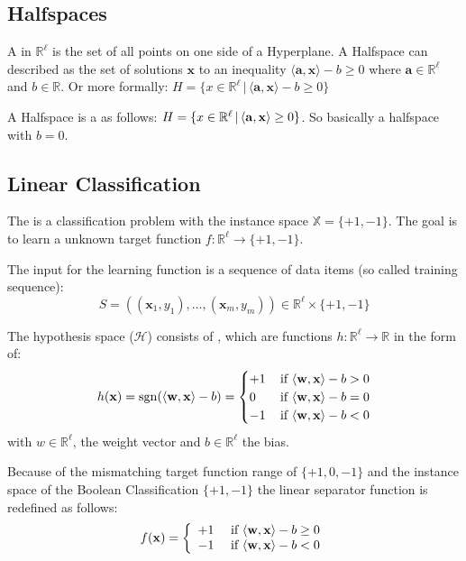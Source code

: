 \subsection{Halfspaces}
A  in $\mathbb{R}^{\ell}$ is the set of all points on one side of a Hyperplane. A Halfspace can described as the set of solutions $\mathbf{x}$ to an inequality $\langle\mathbf{a}, \mathbf{x}\rangle - b \geq 0$ where $\mathbf{a} \in \mathbb{R}^\ell$ and $b \in \mathbb{R}$. Or more formally: $H = \{x \in \mathbb{R}^\ell \, | \, \langle\mathbf{a}, \mathbf{x}\rangle - b \geq 0\}$

A Halfspace is a  as follows: $H = \{x \in \mathbb{R}^\ell \, | \, \langle\mathbf{a}, \mathbf{x}\rangle \geq 0\}$. So basically a halfspace with $b = 0$.

\subsection{Linear Classification}
The  is a classification problem with the instance space $\mathbb{X} = \{+1,-1\}$. The goal is to learn a unknown target function $f:\mathbb{R}^\ell \rightarrow \{+1,-1\}$.

The input for the learning function is a sequence of data items (so called training sequence):
\begin{equation}
S=((\mathbf{x}_{1}, y_{1}), \ldots,(\mathbf{x}_{m}, y_{m})) \in \mathbb{R}^{\ell} \times\{+1,-1\}
\end{equation}

The hypothesis space ($\mathcal{H}$) consists of , which are functions $h:\mathbb{R}^\ell \rightarrow \mathbb{R}$ in the form of:
\begin{equation} 
h(\mathbf{x})=\operatorname{sgn}(\langle\mathbf{w}, \mathbf{x}\rangle- b)=
\begin{cases}
+1 & \, \text {if }\langle\mathbf{w}, \mathbf{x}\rangle - b>0 \\
0 & \,\text {if }\langle\mathbf{w}, \mathbf{x}\rangle - b=0 \\
-1 & \,\text {if }\langle\mathbf{w}, \mathbf{x}\rangle - b<0
\end{cases}
\end{equation}
with $w \in \mathbb{R}^\ell$, the weight vector and $b\in \mathbb{R}^\ell$ the bias.

Because of the mismatching target function range of $\{+1,0,-1\}$ and the instance space of the Boolean Classification $\{+1,-1\}$ the linear separator function is redefined as follows:
\begin{equation}
f(\mathbf{x})=\left\{\begin{array}{ll}{+1} & {\text { if } \langle\mathbf{w}, \mathbf{x}\rangle - b \geq 0} \\ {-1} & {\text { if }\langle\mathbf{w}, \mathbf{x}\rangle - b<0}\end{array}\right.
\end{equation}


